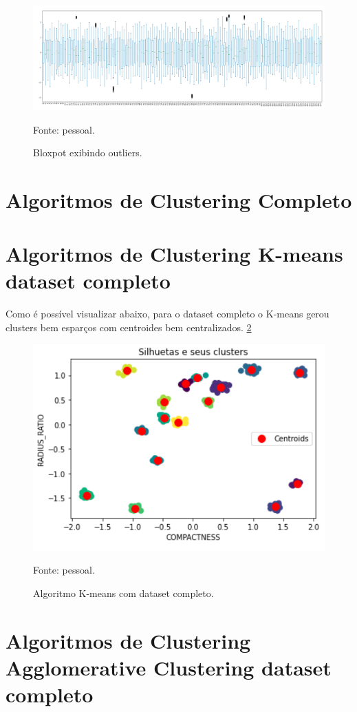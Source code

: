 \begin{figure}[h]
	\centering
	\includegraphics[width=0.7\linewidth]{images/dim128_bloxpot}
	\caption{Bloxpot exibindo outliers.}
	Fonte: pessoal.
	\label{fig:dim128-bloxpot}
\end{figure}


\section{Algoritmos de Clustering Completo}

\section{Algoritmos de Clustering K-means dataset completo}

Como é possível visualizar abaixo, para o dataset completo o K-means gerou clusters bem esparços com centroides bem centralizados. \ref{fig:dim128_kmeans_completo}

\begin{figure}[h]
	\centering
	\includegraphics[width=0.7\linewidth]{images/dim128_kmeans_completo}
	\caption{Algoritmo K-means com dataset completo.}
	Fonte: pessoal.
	\label{fig:dim128_kmeans_completo}
\end{figure}

\section{Algoritmos de Clustering Agglomerative Clustering dataset completo}

